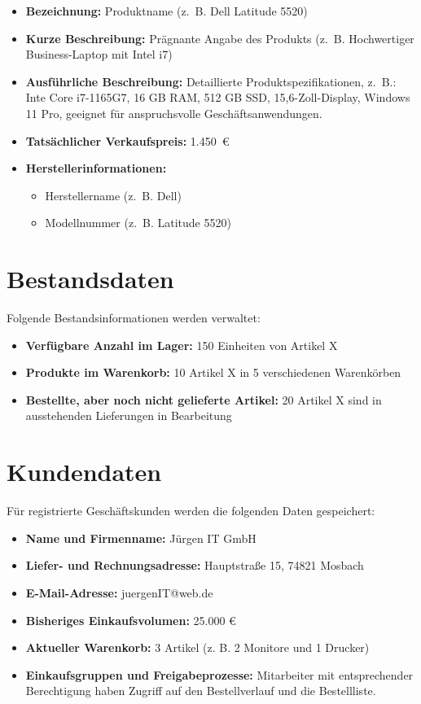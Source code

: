 \documentclass[%
	12pt,
	a4paper,
	oneside,
	parskip=full
]{scrbook}
\begin{document}
\begin{itemize}
	\item \textbf{Bezeichnung:} Produktname (z.~B. Dell Latitude 5520)
	\item \textbf{Kurze Beschreibung:} Prägnante Angabe des Produkts (z.~B. Hochwertiger Business-Laptop mit Intel i7)
	\item \textbf{Ausführliche Beschreibung:}  
	Detaillierte Produktspezifikationen, z.~B.:  
	Inte Core i7-1165G7, 16 GB RAM, 512 GB SSD, 15,6-Zoll-Display, Windows 11 Pro, geeignet für anspruchsvolle Geschäftsanwendungen.
	\item \textbf{Tatsächlicher Verkaufspreis:} 1.450~\euro
	\item \textbf{Herstellerinformationen:}  
	\begin{itemize}
		\item Herstellername (z.~B. Dell)  
		\item Modellnummer (z.~B. Latitude 5520)  
	\end{itemize}
\end{itemize}

\section{Bestandsdaten}
Folgende Bestandsinformationen werden verwaltet:

\begin{itemize}
	\item \textbf{Verfügbare Anzahl im Lager:} 150 Einheiten von Artikel X
	\item \textbf{Produkte im Warenkorb:} 10 Artikel X in 5 verschiedenen Warenkörben
	\item \textbf{Bestellte, aber noch nicht gelieferte Artikel:} 20 Artikel X sind in ausstehenden Lieferungen in Bearbeitung
\end{itemize}

\section{Kundendaten}
Für registrierte Geschäftskunden werden die folgenden Daten gespeichert:

\begin{itemize}
	\item \textbf{Name und Firmenname:} Jürgen IT GmbH
	\item \textbf{Liefer- und Rechnungsadresse:} Hauptstraße 15, 74821 Mosbach
	\item \textbf{E-Mail-Adresse:} juergenIT@web.de
	\item \textbf{Bisheriges Einkaufsvolumen:} 25.000 €
	\item \textbf{Aktueller Warenkorb:} 3 Artikel (z. B. 2 Monitore und 1 Drucker)
	\item \textbf{Einkaufsgruppen und Freigabeprozesse:}  
	Mitarbeiter mit entsprechender Berechtigung haben Zugriff auf den Bestellverlauf und die Bestellliste.
\end{itemize}
\end{document}
